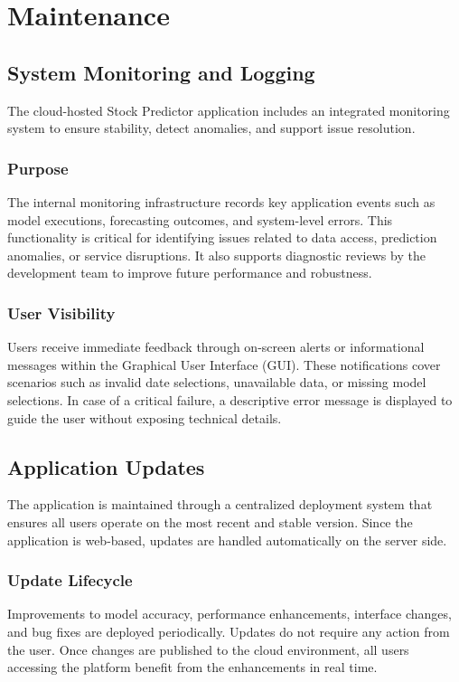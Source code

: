 %
%

\chapter{Maintenance}

\section{System Monitoring and Logging}
The cloud-hosted Stock Predictor application includes an integrated monitoring system to ensure stability, detect anomalies, and support issue resolution.

\subsection{Purpose}
The internal monitoring infrastructure records key application events such as model executions, forecasting outcomes, and system-level errors. This functionality is critical for identifying issues related to data access, prediction anomalies, or service disruptions. It also supports diagnostic reviews by the development team to improve future performance and robustness.

\subsection{User Visibility}
Users receive immediate feedback through on-screen alerts or informational messages within the Graphical User Interface (GUI). These notifications cover scenarios such as invalid date selections, unavailable data, or missing model selections. In case of a critical failure, a descriptive error message is displayed to guide the user without exposing technical details.

\section{Application Updates}
The application is maintained through a centralized deployment system that ensures all users operate on the most recent and stable version. Since the application is web-based, updates are handled automatically on the server side.

\subsection{Update Lifecycle}
Improvements to model accuracy, performance enhancements, interface changes, and bug fixes are deployed periodically. Updates do not require any action from the user. Once changes are published to the cloud environment, all users accessing the platform benefit from the enhancements in real time.

